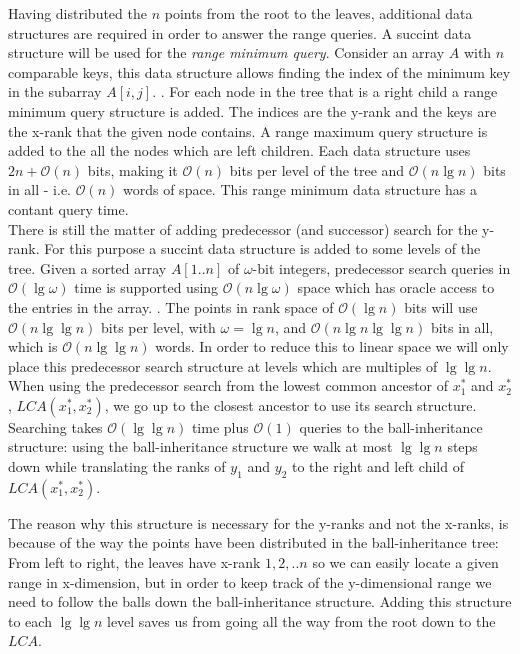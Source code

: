 Having distributed the $n$ points from the root to the leaves, additional data structures are required in order to answer the range queries. A succint data structure will be used for the \emph{range minimum query}. Consider an array $A$ with $n$ comparable keys, this data structure allows finding the index of the minimum key in the subarray $A[i,j]$. . For each node in the tree that is a right child a range minimum query structure is added. The indices are the y-rank and the keys are the x-rank that the given node contains. A range maximum query structure is added to the all the nodes which are left children. Each data structure uses $2n + \mathcal{O}(n)$ bits, making it $\mathcal{O}(n)$ bits per level of the tree and $\mathcal{O}(n \lg n)$ bits in all - i.e. $\mathcal{O}(n)$ words of space. This range minimum data structure has a contant query time. \\

There is still the matter of adding predecessor (and successor) search for the y-rank.
For this purpose a succint data structure is added to some levels of the tree. Given a sorted array $A[1..n]$ of $\omega$-bit integers, predecessor search queries in $\mathcal{O}(\lg \omega)$ time is supported using $\mathcal{O}(n \lg \omega)$ space which has oracle access to the entries in the array. . The points in rank space of $\mathcal{O}(\lg n)$ bits will use $\mathcal{O}(n \lg \lg n)$ bits per level, with $\omega = \lg n$, and $\mathcal{O}(n \lg n \lg \lg n)$ bits in all, which is $\mathcal{O}(n \lg \lg n)$ words. In order to reduce this to linear space we will only place this predecessor search structure at levels which are multiples of $\lg \lg n$. When using the predecessor search from the lowest common ancestor of $x^*_1$ and $x^*_2$, $LCA(x^*_1, x^*_2)$, we go up to the closest ancestor to use its search structure. Searching takes $\mathcal{O}(\lg \lg n)$ time plus $\mathcal{O}(1)$ queries to the ball-inheritance structure: using the ball-inheritance structure we walk at most $\lg \lg n$ steps down while translating the ranks of $y_1$ and $y_2$ to the right and left child of $LCA(x^*_1, x^*_2)$. 

The reason why this structure is necessary for the y-ranks and not the x-ranks, is because of the way the points have been distributed in the ball-inheritance tree: From left to right, the leaves have x-rank $1,2,..n$ so we can easily locate a given range in x-dimension, but in order to keep track of the y-dimensional range we need to follow the balls down the ball-inheritance structure. Adding this structure to each $\lg \lg n$ level saves us from going all the way from the root down to the $LCA$.  \\

